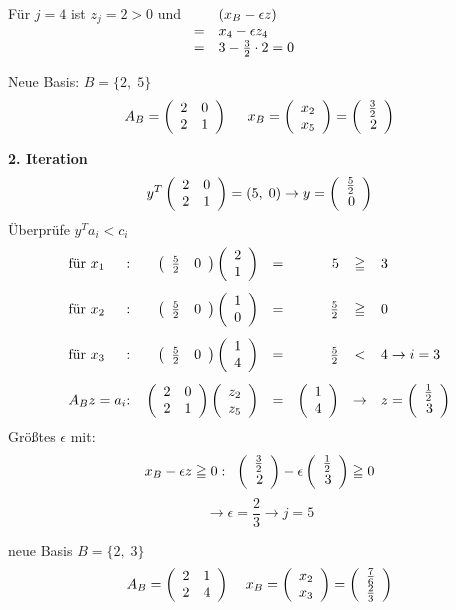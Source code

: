 Für $j=4$ ist $z_{j} =2 > 0$ und $\begin{array}[t]{cl}&(x_{B} -\epsilon z)\\ 
=&x_{4} -\epsilon z_{4}\\
=&3- \frac{3}{2} \cdot 2 = 0\end{array}$

Neue Basis: $B=\{2,\; 5\}$
\[A_{B}=\mat{rr}{2&0\\2&1} \hspace{5mm} x_{B} = \vect{x_{2}\\x_{5}} =
\vect{\frac{3}{2}\\2}\]

{\bf 2. Iteration}\\
\[y^{T} \mat{rr}{2&0\\2&1} = (5, \; 0) \rightarrow y =
\vect{\frac{5}{2}\\0}\]
Überprüfe $y^{T}a_{i} < c_{i}$
\[\begin{array}{l@{:\hspace{4mm}}rcrcl}
\mbox{für } x_{1}& \mat{rr}{\frac{5}{2}&0} \vect{2\\1} &=& 5&\geqq&3
\vspace{3mm}\\
\mbox{für }x_{2}& \mat{rr}{\frac{5}{2}&0} \vect{1\\0}&=&\frac{5}{2}
&\geqq&0\vspace{3mm}\\
\mbox{für }x_{3}& \mat{rr}{\frac{5}{2}&0} \vect{1\\4}&=&\frac{5}{2} &<& 4
\rightarrow i=3\vspace{3mm}\\
A_{B}z = a_{i} & \mat{rr}{2&0\\2&1} \vect{z_{2}\\z_{5}} &=&
\vect{1\\4} &\rightarrow& z=\vect{\frac{1}{2}\\3}\end{array}\]
Größtes $\epsilon$ mit:
\[x_{B} -\epsilon z \geqq 0: \;\; \vect{\frac{3}{2}\\2} - \epsilon
\vect{\frac{1}{2}\\3} \geqq 0\]
\[\rightarrow \epsilon = \frac{2}{3} \rightarrow j = 5\]

neue Basis $B = \{2, \; 3\}$
\[A_{B} = \mat{rr}{2&1\\2&4} \hspace{4mm} x_{B} = \vect{x_{2}\\x_{3}} =
\vect{\frac{7}{6}\\\frac{2}{3}}\]

